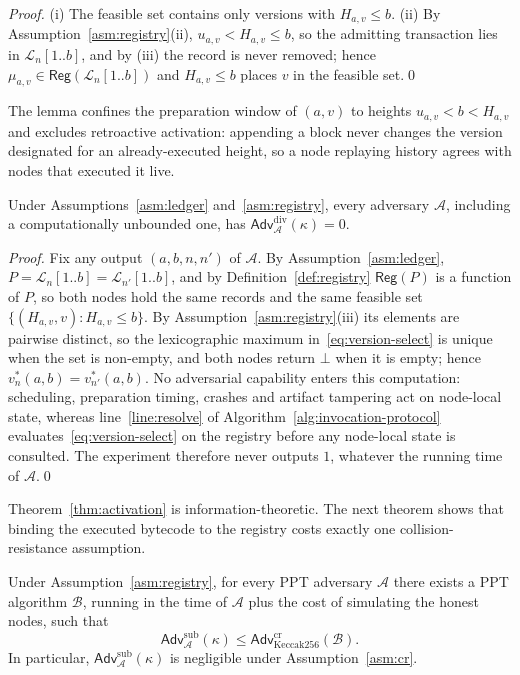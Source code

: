 \documentclass[runningheads]{llncs}
\begin{document}
\begin{proof}
(i) The feasible set contains only versions with $H_{a,v}\le b$. (ii) By Assumption~\ref{asm:registry}(ii), $u_{a,v}<H_{a,v}\le b$, so the admitting transaction lies in $\mathcal{L}_n[1..b]$, and by (iii) the record is never removed; hence $\mu_{a,v}\in\mathsf{Reg}(\mathcal{L}_n[1..b])$ and $H_{a,v}\le b$ places $v$ in the feasible set.\qed
\end{proof}

The lemma confines the preparation window of $(a,v)$ to heights $u_{a,v}<b<H_{a,v}$ and excludes retroactive activation: appending a block never changes the version designated for an already-executed height, so a node replaying history agrees with nodes that executed it live.

\begin{theorem}
\label{thm:activation}
Under Assumptions~\ref{asm:ledger} and~\ref{asm:registry}, every adversary $\mathcal{A}$, including a computationally unbounded one, has $\mathsf{Adv}^{\mathrm{div}}_{\mathcal{A}}(\kappa)=0$.
\end{theorem}

\begin{proof}
Fix any output $(a,b,n,n')$ of $\mathcal{A}$. By Assumption~\ref{asm:ledger}, $P=\mathcal{L}_n[1..b]=\mathcal{L}_{n'}[1..b]$, and by Definition~\ref{def:registry} $\mathsf{Reg}(P)$ is a function of $P$, so both nodes hold the same records and the same feasible set $\{(H_{a,v},v): H_{a,v}\le b\}$. By Assumption~\ref{asm:registry}(iii) its elements are pairwise distinct, so the lexicographic maximum in~\eqref{eq:version-select} is unique when the set is non-empty, and both nodes return $\bot$ when it is empty; hence $v^{*}_{n}(a,b)=v^{*}_{n'}(a,b)$. No adversarial capability enters this computation: scheduling, preparation timing, crashes and artifact tampering act on node-local state, whereas line~\ref{line:resolve} of Algorithm~\ref{alg:invocation-protocol} evaluates~\eqref{eq:version-select} on the registry before any node-local state is consulted. The experiment therefore never outputs $1$, whatever the running time of $\mathcal{A}$.\qed
\end{proof}

Theorem~\ref{thm:activation} is information-theoretic. The next theorem shows that binding the executed bytecode to the registry costs exactly one collision-resistance assumption.

\begin{theorem}
\label{thm:binding}
Under Assumption~\ref{asm:registry}, for every PPT adversary $\mathcal{A}$ there exists a PPT algorithm $\mathcal{B}$, running in the time of $\mathcal{A}$ plus the cost of simulating the honest nodes, such that
\begin{equation}
\mathsf{Adv}^{\mathrm{sub}}_{\mathcal{A}}(\kappa)\le\mathsf{Adv}^{\mathrm{cr}}_{\mathrm{Keccak256}}(\mathcal{B}).
\label{eq:binding-bound}
\end{equation}
In particular, $\mathsf{Adv}^{\mathrm{sub}}_{\mathcal{A}}(\kappa)$ is negligible under Assumption~\ref{asm:cr}.
\end{theorem}
\end{document}
